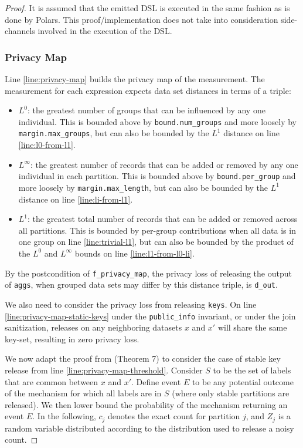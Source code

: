 \documentclass{article}
\begin{document}
\begin{proof}
It is assumed that the emitted DSL is executed in the same fashion as is done by Polars.
This proof/implementation does not take into consideration side-channels involved in the execution of the DSL.

\subsubsection{Privacy Map}
Line \ref{line:privacy-map} builds the privacy map of the measurement.
The measurement for each expression expects data set distances in terms of a triple:
\begin{itemize}
    \item $L^0$: the greatest number of groups that can be influenced by any one individual. 
    This is bounded above by \texttt{bound.num\_groups} and more loosely by \texttt{margin.max\_groups},
    but can also be bounded by the $L^1$ distance on line \ref{line:l0-from-l1}.
    \item $L^\infty$: the greatest number of records that can be added or removed by any one individual in each partition. 
    This is bounded above by \texttt{bound.per\_group} and more loosely by \texttt{margin.max\_length},
    but can also be bounded by the $L^1$ distance on line \ref{line:li-from-l1}.
    \item $L^1$: the greatest total number of records that can be added or removed across all partitions.
    This is bounded by per-group contributions when all data is in one group on line \ref{line:trivial-l1},
    but can also be bounded by the product of the $L^0$ and $L^\infty$ bounds on line \ref{line:l1-from-l0-li}.
\end{itemize}

By the postcondition of \texttt{f\_privacy\_map}, the privacy loss of releasing the output of \texttt{aggs}, 
when grouped data sets may differ by this distance triple,
is \texttt{d\_out}.

We also need to consider the privacy loss from releasing \texttt{keys}.
On line \ref{line:privacy-map-static-keys} under the \texttt{public\_info} invariant, or under the join sanitization, 
releases on any neighboring datasets $x$ and $x'$ will share the same key-set,
resulting in zero privacy loss.

We now adapt the proof from \cite{rogers2023unifyingprivacyanalysisframework} (Theorem 7) 
to consider the case of stable key release from line \ref{line:privacy-map-threshold}.
Consider $S$ to be the set of labels that are common between $x$ and $x'$.
Define event $E$ to be any potential outcome of the mechanism for which all labels are in $S$
(where only stable partitions are released).
We then lower bound the probability of the mechanism returning an event $E$.
In the following, $c_j$ denotes the exact count for partition $j$,
and $Z_j$ is a random variable distributed according to the distribution used to release a noisy count.


\end{proof}
\end{document}
